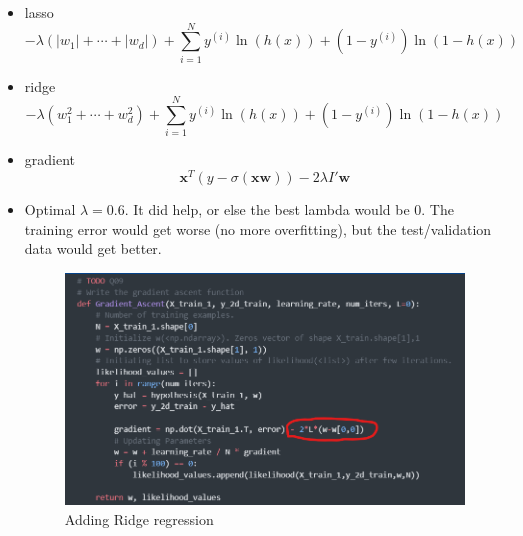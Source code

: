 \documentclass[12pt]{article}
\begin{document}
\begin{itemize}
	\item lasso \[ -\lambda\left(|w_1| + \cdots + |w_d|\right) + \sum\limits_{i=1}^{N} y^{(i)} \ln{(h(x))} + (1-y^{(i)})\ln{(1-h(x))} \]
	
	\item ridge \[ -\lambda\left(w_1^2 + \cdots + w_d^2\right) + \sum\limits_{i=1}^{N} y^{(i)} \ln{(h(x))} + (1-y^{(i)})\ln{(1-h(x))} \]
	
	\item gradient \[\textbf{x}^T(y-\sigma{(\textbf{x}\mathbf{w})}) - 2 \lambda I' \mathbf{w}\]
	
	\item Optimal $ \lambda = 0.6 $. It did help, or else the best lambda would be 0. The training error would get worse (no more overfitting), but the test/validation data would get better.
	\begin{figure}[H]
		\centering
		\includegraphics{images/ridgereg.png}
		\caption{Adding Ridge regression}
		\label{fig:4:ridgereg}
	\end{figure}
	

\end{itemize}
\end{document}
